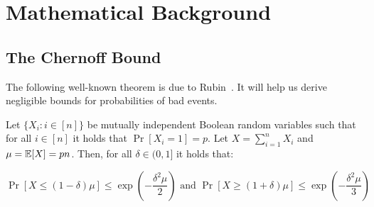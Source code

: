 \section{Mathematical Background}
\subsection{The Chernoff Bound}

The following well-known theorem is due to
Rubin~\cite{chernoff1952measure,chernoff2014career}. It will help us derive
negligible bounds for probabilities of bad events.

\begin{theorem}
  Let $\{X_i: i \in [n]\}$ be mutually independent Boolean random variables
  such that for all $i \in [n]$ it holds that $\Pr[X_i = 1] = p$. Let
  $X = \sum_{i = 1}^n X_i$ and $\mu = \operatorname{\mathbb{E}}[X] = pn$. Then, for all
  $\delta \in (0, 1]$ it holds that:

  \[
    \Pr[X \leq (1 - \delta)\mu] \leq \exp(-\frac{\delta^2\mu}{2})
    \text{ and }
    \Pr[X \geq (1 + \delta)\mu] \leq \exp(-\frac{\delta^2\mu}{3})
  \]
\end{theorem}
